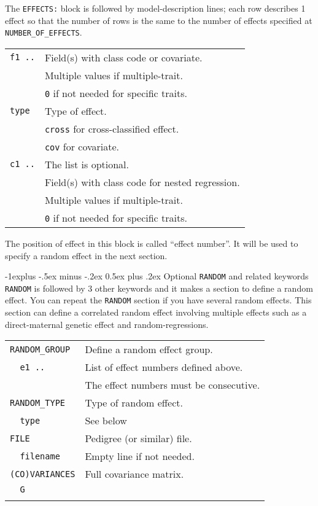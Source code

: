 \documentclass[10pt,landscape]{article}
\makeatletter
\renewcommand{\subsection}{\@startsection{subsection}{2}{0mm}%
                                {-1explus -.5ex minus -.2ex}%
                                {0.5ex plus .2ex}%
                                {\normalfont\normalsize\bfseries}}
\makeatother
\begin{document}
\begin{multicols}{3}
The \verb|EFFECTS:| block is followed by model-description lines; each row describes 1 effect so that the number of rows is the same to the number of effects specified at \verb|NUMBER_OF_EFFECTS|.
\begin{tabular}{@{}ll@{}}
  \verb|f1 ..| & Field(s) with class code or covariate.\\
              & Multiple values if multiple-trait.\\
              & \verb|0| if not needed for specific traits.\\
  \verb|type|  & Type of effect.\\
              & \verb|cross| for cross-classified effect.\\
              & \verb|cov| for covariate.\\
  \verb|c1 ..| & The list is optional.\\
              & Field(s) with class code for nested regression.\\
              & Multiple values if multiple-trait.\\
              & \verb|0| if not needed for specific traits.\\
\end{tabular}

The position of effect in this block is called ``effect number''.
It will be used to specify a random effect in the next section.

\subsection{Optional \texttt{RANDOM} and related keywords}
\verb|RANDOM| is followed by 3 other keywords and it makes a section to define a random effect.
You can repeat the \verb|RANDOM| section if you have several random effects.
This section can define a correlated random effect involving multiple effects such as a direct-maternal genetic effect and random-regressions.

\begin{tabular}{@{}ll@{}}
  \\
  \verb|RANDOM_GROUP| & Define a random effect group.\\
  \verb|  e1 ..|  & List of effect numbers defined above.\\
               & The effect numbers must be consecutive.\\
  \verb|RANDOM_TYPE| & Type of random effect.\\
  \verb|  type|   & See below\\
  \verb|FILE| & Pedigree (or similar) file.\\
  \verb|  filename|   & Empty line if not needed.\\
  \verb|(CO)VARIANCES| & Full covariance matrix.\\
  \verb|  G|   & \\
  \\
\end{tabular}


\end{multicols}
\end{document}
